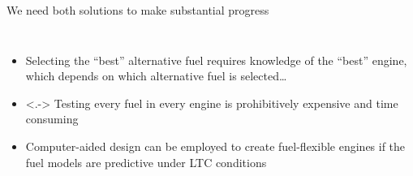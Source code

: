 \documentclass{beamer}
\begin{document}
\begin{frame}{We need both solutions to make substantial progress}
    \begin{columns}
            \begin{itemize}
                \item<+-> Selecting the ``best'' alternative fuel requires knowledge
                    of the ``best'' engine, which depends on which
                    alternative fuel is selected\ldots
                \item<.-> Testing every fuel in every engine is prohibitively expensive
                    and time consuming
                \item<+-> Computer-aided design can be employed to create fuel-flexible
                    engines \alert{if the fuel models are predictive under LTC conditions}
            \end{itemize}
            \centering
    \end{columns}
\end{frame}
\end{document}
